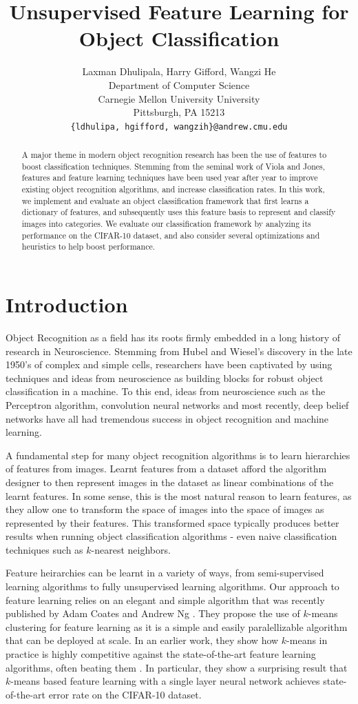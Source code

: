 \documentclass{article} %
\title{Unsupervised Feature Learning for Object Classification}
\author{
Laxman Dhulipala, Harry Gifford, Wangzi He \\
Department of Computer Science\\
Carnegie Mellon University University\\
Pittsburgh, PA 15213 \\
\texttt{\{ldhulipa, hgifford, wangzih\}@andrew.cmu.edu} \\
}
\begin{document}
\maketitle

\begin{abstract}
A major theme in modern object recognition research has been the use of
features to boost classification techniques. Stemming from the seminal work
of Viola and Jones, features and feature learning techniques have been used
year after year to improve existing object recognition algorithms, and increase
classification rates. In this work, we implement and evaluate an object classification framework
that first learns a dictionary of features, and subsequently uses this feature basis
to represent and classify images into categories. We evaluate our classification framework
by analyzing its performance on the CIFAR-10 dataset, and also consider several optimizations
and heuristics to help boost performance.
\end{abstract}

\section{Introduction}

Object Recognition as a field has its roots firmly embedded in a long history
of research in Neuroscience. Stemming from Hubel and Wiesel's discovery in the
late 1950's of complex and simple cells, researchers have been captivated by using
techniques and ideas from neuroscience as building blocks for robust object
classification in a machine\cite{hubel}. To this end, ideas from neuroscience such as the Perceptron
algorithm, convolution neural networks and most recently, deep belief networks have all
had tremendous success in object recognition and machine learning.

A fundamental step for many object recognition algorithms is to learn hierarchies
of features from images. Learnt features from a dataset afford the algorithm designer
to then represent images in the dataset as linear combinations of the learnt features.
In some sense, this is the most natural reason to learn features, as they allow one
to transform the space of images into the space of images as represented by their features.
This transformed space typically produces better results when running object classification
algorithms - even naive classification techniques such as $k$-nearest neighbors.

Feature heirarchies can be learnt in a variety of ways, from semi-supervised learning
algorithms to fully unsupervised learning algorithms.
Our approach to feature learning relies on an elegant and simple algorithm that was
recently published by Adam Coates and Andrew Ng \cite{coates}. They propose the use
of $k$-means clustering for feature learning as it is a simple and easily paralellizable
algorithm that can be deployed at scale. In an earlier work, they show how $k$-means in
practice is highly competitive against the state-of-the-art feature learning algorithms,
often beating them \cite{coates11}. In particular, they show a surprising result that
$k$-means based feature learning with a single layer neural network achieves state-of-the-art
error rate on the CIFAR-10 dataset.
\end{document}

